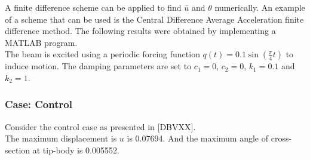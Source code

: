 \documentclass[../../main.tex]{subfiles}
\begin{document}
A finite difference scheme can be applied to find $\bar{u}$ and $\theta$ numerically. An example of a scheme that can be used is the Central Difference Average Acceleration finite difference method. The following results were obtained by implementing a MATLAB program.\\

The beam is excited using a periodic forcing function $q(t) = 0.1 \sin(\frac{\pi}{4}t)$ to induce motion. The damping parameters are set to $c_1 = 0$, $c_2 = 0$, $k_1 = 0.1$ and $k_2 = 1$.

\newpage
\FloatBarrier
\subsubsection{Case: Control}
Consider the control case as presented in [DBVXX].\\

 The maximum displacement is $u$ is 0.07694. And the maximum angle of cross-section at tip-body is 0.005552.

\begin{figure}[!hb]
\end{figure}

\begin{table}[!hb]
\end{table}
\end{document}
